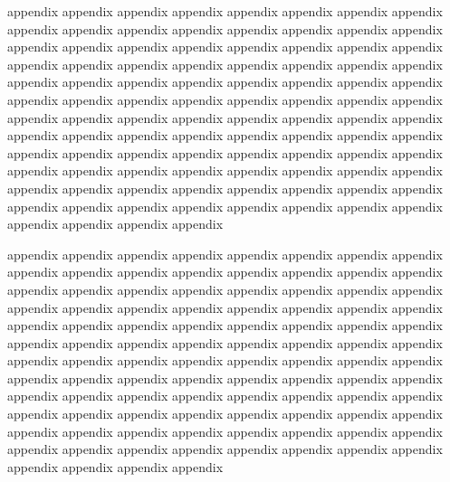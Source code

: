 \documentclass[platex,ja=standard,12pt,a4paper,twoside,onecolumn,fleqn,dvipdfmx,english]{bxjsbook}
\begin{document}
appendix appendix appendix appendix appendix appendix appendix appendix appendix appendix appendix appendix appendix appendix appendix appendix appendix appendix appendix appendix appendix appendix appendix appendix appendix appendix appendix appendix appendix appendix appendix appendix appendix appendix appendix appendix appendix appendix appendix appendix appendix appendix appendix appendix appendix appendix appendix appendix appendix appendix appendix appendix appendix appendix appendix appendix appendix appendix appendix appendix appendix appendix appendix appendix appendix appendix appendix appendix appendix appendix appendix appendix appendix appendix appendix appendix appendix appendix appendix appendix appendix appendix appendix appendix appendix appendix appendix appendix appendix appendix appendix appendix appendix appendix appendix appendix appendix appendix appendix appendix

appendix appendix appendix appendix appendix appendix appendix appendix appendix appendix appendix appendix appendix appendix appendix appendix appendix appendix appendix appendix appendix appendix appendix appendix appendix appendix appendix appendix appendix appendix appendix appendix appendix appendix appendix appendix appendix appendix appendix appendix appendix appendix appendix appendix appendix appendix appendix appendix appendix appendix appendix appendix appendix appendix appendix appendix appendix appendix appendix appendix appendix appendix appendix appendix appendix appendix appendix appendix appendix appendix appendix appendix appendix appendix appendix appendix appendix appendix appendix appendix appendix appendix appendix appendix appendix appendix appendix appendix appendix appendix appendix appendix appendix appendix appendix appendix appendix appendix appendix appendix
\end{document}
